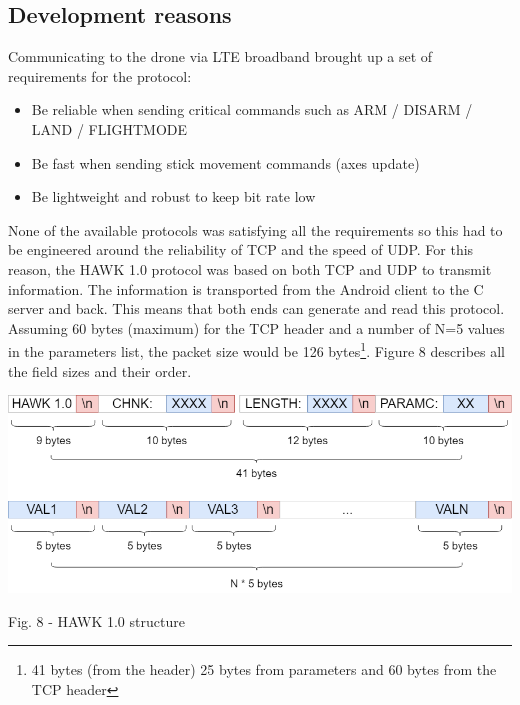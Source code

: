\documentclass{IEEEtran}
\begin{document}
\subsection*{Development reasons}
\noindent Communicating to the drone via LTE broadband brought up a set of requirements for the protocol:
\begin{itemize}
    \item Be reliable when sending critical commands such as ARM / DISARM / LAND / FLIGHTMODE
    \item Be fast when sending stick movement commands (axes update)
    \item Be lightweight and robust to keep bit rate low
\end{itemize}
None of the available protocols was satisfying all the requirements so this had to be engineered around the reliability of TCP and the speed of UDP. For this reason, the HAWK 1.0 protocol was based on both TCP and UDP to transmit information. The information is transported from the Android client to the C server and back. This means that both ends can generate and read this protocol.
\newline
\newline
\noindent Assuming 60 bytes (maximum) for the TCP header and a number of N=5 values in the parameters list, the packet size would be 126 bytes\footnote{41 bytes (from the header) 25 bytes from parameters and 60 bytes from the TCP header}. Figure 8 describes all the field sizes and their order.
\begin{center}\includegraphics[scale=.29]{hawkone.png}\end{center}
\begin{it}\begin{center}Fig. 8 - HAWK 1.0 structure \end{center}\end{it}
\end{document}
